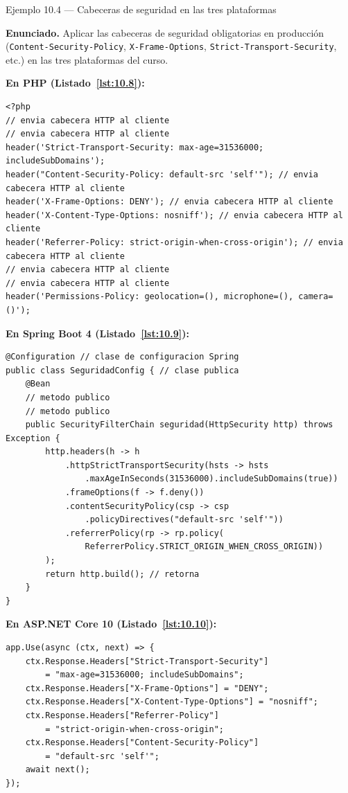 \begin{cajaejemplo}{Ejemplo 10.4 --- Cabeceras de seguridad en las tres plataformas}

\textbf{Enunciado.} Aplicar las cabeceras de seguridad obligatorias en producción (\texttt{Content-Security-Policy}, \texttt{X-Frame-Options}, \texttt{Strict-Transport-Security}, etc.) en las tres plataformas del curso.

\textbf{En PHP (Listado~\ref{lst:10.8}):}
\begin{lstlisting}[style=php,numbers=none,caption={Ejemplo de PHP},label=lst:10.8]
<?php
// envia cabecera HTTP al cliente
// envia cabecera HTTP al cliente
header('Strict-Transport-Security: max-age=31536000; includeSubDomains');
header("Content-Security-Policy: default-src 'self'"); // envia cabecera HTTP al cliente
header('X-Frame-Options: DENY'); // envia cabecera HTTP al cliente
header('X-Content-Type-Options: nosniff'); // envia cabecera HTTP al cliente
header('Referrer-Policy: strict-origin-when-cross-origin'); // envia cabecera HTTP al cliente
// envia cabecera HTTP al cliente
// envia cabecera HTTP al cliente
header('Permissions-Policy: geolocation=(), microphone=(), camera=()');
\end{lstlisting}

\textbf{En Spring Boot 4 (Listado~\ref{lst:10.9}):}
\begin{lstlisting}[style=java,numbers=none,caption={Ejemplo de Java},label=lst:10.9]
@Configuration // clase de configuracion Spring
public class SeguridadConfig { // clase publica
    @Bean
    // metodo publico
    // metodo publico
    public SecurityFilterChain seguridad(HttpSecurity http) throws Exception {
        http.headers(h -> h
            .httpStrictTransportSecurity(hsts -> hsts
                .maxAgeInSeconds(31536000).includeSubDomains(true))
            .frameOptions(f -> f.deny())
            .contentSecurityPolicy(csp -> csp
                .policyDirectives("default-src 'self'"))
            .referrerPolicy(rp -> rp.policy(
                ReferrerPolicy.STRICT_ORIGIN_WHEN_CROSS_ORIGIN))
        );
        return http.build(); // retorna
    }
}
\end{lstlisting}

\textbf{En ASP.NET Core 10 (Listado~\ref{lst:10.10}):}
\begin{lstlisting}[style=cs,numbers=none,caption={Ejemplo de C\#},label=lst:10.10]
app.Use(async (ctx, next) => {
    ctx.Response.Headers["Strict-Transport-Security"]
        = "max-age=31536000; includeSubDomains";
    ctx.Response.Headers["X-Frame-Options"] = "DENY";
    ctx.Response.Headers["X-Content-Type-Options"] = "nosniff";
    ctx.Response.Headers["Referrer-Policy"]
        = "strict-origin-when-cross-origin";
    ctx.Response.Headers["Content-Security-Policy"]
        = "default-src 'self'";
    await next();
});
\end{lstlisting}
\end{cajaejemplo}

